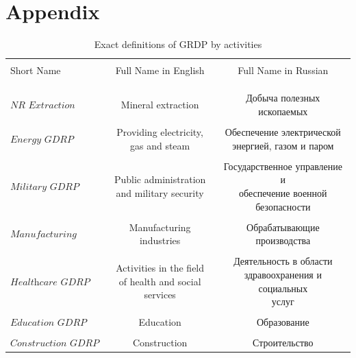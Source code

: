 \documentclass[12pt]{article}
\numberwithin{equation}{section}
\numberwithin{table}{section}
\numberwithin{figure}{section}
\begin{document}
\newpage ~

\newpage
\appendix

\section{Appendix}
\begin{table}[!h]\centering\footnotesize
  \caption{Exact definitions of GRDP by activities}
  \label{tab:definitions}
  \begin{tabular}{@{\extracolsep{5pt}}lcc}
    \\[-1.8ex]\hline 
\hline \\[-1.8ex] 
  Short Name & Full Name in English& Full Name in Russian\\
  \\ 
  \hline \\[-1.8ex] \\
  $\textit{NR Extraction GRDP}$ &Mineral extraction &\makecell[c]{Добыча полезных \\ ископаемых}\\ 
  & & \\ 
  $\textit{Energy GDRP}$ & \makecell[c]{Providing electricity,\\ gas and steam}&\makecell[c]{Обеспечение электрической \\энергией, газом и паром} \\ 
  & & \\ 
 $\textit{Military GDRP}$ &\makecell[c]{Public administration \\ and military security} &\makecell[c]{Государственное управление и \\обеспечение военной безопасности} \\ 
  & & \\ 
 $\textit{Manufacturing GDRP}$ &Manufacturing industries& Обрабатывающие производства\\ 
  & & \\ 
 $\textit{Healthcare GDRP}$ &\makecell[c]{Activities in the field\\ of health and social services}& \makecell[c]{Деятельность в области \\здравоохранения и социальных\\ услуг} \\ 
  & & \\ 
 $\textit{Education GDRP}$ & Education & Образование \\ 
  & & \\ 
 $\textit{Construction GDRP}$ & Construction
  &Строительство \\ 

\end{tabular}
\end{table}
\end{document}
